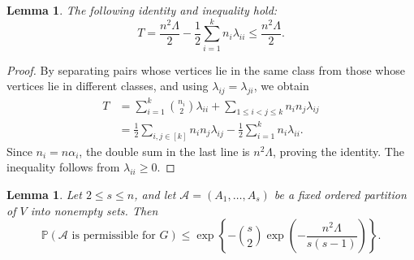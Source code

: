 \documentclass{article}
\newtheorem{lem}[thm]{Lemma}
\newcommand{\Prob}{\mathbb{P}}
\begin{document}
\begin{lem}\label{lem:total-weight}
The following identity and inequality hold:
\begin{equation}\label{eq:total-weight}
  T
  =\frac{n^2\Lambda}{2}
   -\frac12\sum_{i=1}^k n_i\lambda_{ii}
  \leq\frac{n^2\Lambda}{2}.
\end{equation}
\end{lem}

\begin{proof}
By separating pairs whose vertices lie in the same class from those
whose vertices lie in different classes, and using
\(\lambda_{ij}=\lambda_{ji}\), we obtain
\begin{align*}
 T
 &=\sum_{i=1}^k\binom{n_i}{2}\lambda_{ii}
   +\sum_{1\leq i<j\leq k}n_in_j\lambda_{ij}\\
 &=\frac12\sum_{i,j\in[k]}n_in_j\lambda_{ij}
   -\frac12\sum_{i=1}^k n_i\lambda_{ii}.
\end{align*}
Since \(n_i=n\alpha_i\), the double sum in the last line is
\(n^2\Lambda\), proving the identity.  The inequality follows from
\(\lambda_{ii}\geq0\).
\end{proof}

\begin{lem}\label{lem:fixed-partition}
Let \(2\leq s\leq n\), and let
\(\mathcal A=(A_1,\dots,A_s)\) be a fixed ordered partition of \(V\)
into nonempty sets.  Then
\begin{equation}\label{eq:fixed-bound}
 \Prob(\mathcal A\text{ is permissible for }G)
 \leq
 \exp\left\{
  -\binom{s}{2}
   \exp\left(-\frac{n^2\Lambda}{s(s-1)}\right)
 \right\}.
\end{equation}
\end{lem}
\end{document}
